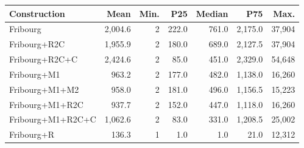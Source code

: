 \begin{tabular}{lrrrrrr}
  \hline
Construction & Mean & Min. & P25 & Median & P75 & Max. \\ 
  \hline
Fribourg & 2,004.6 & 2 & 222.0 & 761.0 & 2,175.0 & 37,904 \\ 
  Fribourg+R2C & 1,955.9 & 2 & 180.0 & 689.0 & 2,127.5 & 37,904 \\ 
  Fribourg+R2C+C & 2,424.6 & 2 & 85.0 & 451.0 & 2,329.0 & 54,648 \\ 
  Fribourg+M1 & 963.2 & 2 & 177.0 & 482.0 & 1,138.0 & 16,260 \\ 
  Fribourg+M1+M2 & 958.0 & 2 & 181.0 & 496.0 & 1,156.5 & 15,223 \\ 
  Fribourg+M1+R2C & 937.7 & 2 & 152.0 & 447.0 & 1,118.0 & 16,260 \\ 
  Fribourg+M1+R2C+C & 1,062.6 & 2 & 83.0 & 331.0 & 1,208.5 & 25,002 \\ 
  Fribourg+R & 136.3 & 1 & 1.0 & 1.0 & 21.0 & 12,312 \\ 
   \hline
\end{tabular}
